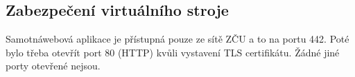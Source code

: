 \subsection{Zabezpečení virtuálního stroje}
Samotnáwebová aplikace je přístupná pouze ze sítě ZČU a to na portu 442.
Poté bylo třeba otevřít port 80 (HTTP) kvůli vystavení TLS certifikátu.
Žádné jiné porty otevřené nejsou.